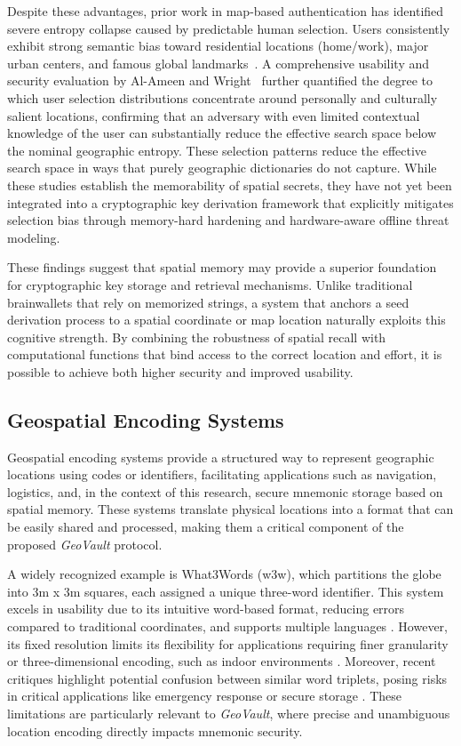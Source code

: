 \documentclass[journal,article,accept,pdftex,moreauthors]{Definitions/mdpi}
\begin{document}
Despite these advantages, prior work in map-based authentication has identified severe entropy collapse caused by predictable human selection. Users consistently exhibit strong semantic bias toward residential locations (home/work), major urban centers, and famous global landmarks~\cite{Sun2012, Thorpe2013, AlAmeen2014}. A comprehensive usability and security evaluation by Al-Ameen and Wright~\cite{AlAmeen2014} further quantified the degree to which user selection distributions concentrate around personally and culturally salient locations, confirming that an adversary with even limited contextual knowledge of the user can substantially reduce the effective search space below the nominal geographic entropy. These selection patterns reduce the effective search space in ways that purely geographic dictionaries do not capture. While these studies establish the memorability of spatial secrets, they have not yet been integrated into a cryptographic key derivation framework that explicitly mitigates selection bias through memory-hard hardening and hardware-aware offline threat modeling.

These findings suggest that spatial memory may provide a superior foundation for cryptographic key storage and retrieval mechanisms. Unlike traditional brainwallets that rely on memorized strings, a system that anchors a seed derivation process to a spatial coordinate or map location naturally exploits this cognitive strength. By combining the robustness of spatial recall with computational functions that bind access to the correct location and effort, it is possible to achieve both higher security and improved usability.

\subsection{Geospatial Encoding Systems}

Geospatial encoding systems provide a structured way to represent geographic locations using codes or identifiers, facilitating applications such as navigation, logistics, and, in the context of this research, secure mnemonic storage based on spatial memory. These systems translate physical locations into a format that can be easily shared and processed, making them a critical component of the proposed \textit{GeoVault} protocol.

A widely recognized example is What3Words (w3w), which partitions the globe into 3m x 3m squares, each assigned a unique three-word identifier. This system excels in usability due to its intuitive word-based format, reducing errors compared to traditional coordinates, and supports multiple languages \cite{Jiang2018a}. However, its fixed resolution limits its flexibility for applications requiring finer granularity or three-dimensional encoding, such as indoor environments \cite{Lee2009}. Moreover, recent critiques highlight potential confusion between similar word triplets, posing risks in critical applications like emergency response or secure storage \cite{Arthur2023}. These limitations are particularly relevant to \textit{GeoVault}, where precise and unambiguous location encoding directly impacts mnemonic security.
\end{document}
